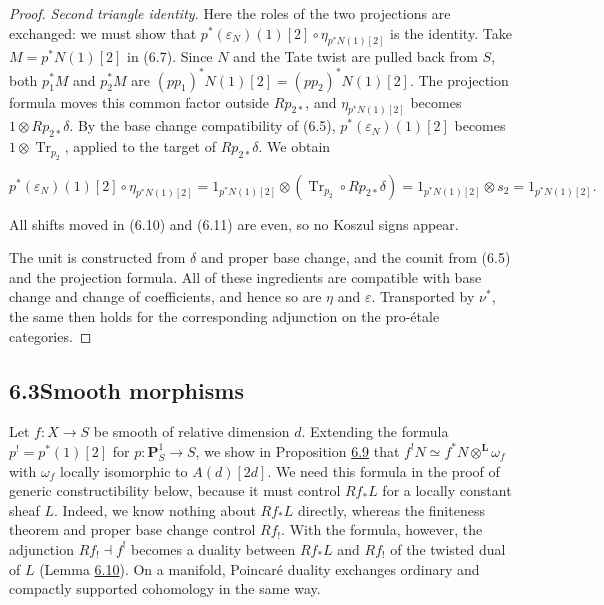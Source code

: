 \documentclass[11pt]{article}
\begin{document}
\begin{proof}[{Proof}]
\emph{Second triangle identity.} Here the roles of the two projections are exchanged: we must show that \(p^*(\varepsilon_N)(1)[2]\circ\eta_{p^*N(1)[2]}\) is the identity. Take \(M=p^*N(1)[2]\) in (6.7). Since \(N\) and the Tate twist are pulled back from \(S\), both \(p_1^*M\) and \(p_2^*M\) are \((pp_1)^*N(1)[2]=(pp_2)^*N(1)[2]\). The projection formula moves this common factor outside \(Rp_{2*}\), and \(\eta_{p^*N(1)[2]}\) becomes \(1\otimes Rp_{2*}\delta\). By the base change compatibility of (6.5), \(p^*(\varepsilon_N)(1)[2]\) becomes \(1\otimes\operatorname{Tr}_{p_2}\), applied to the target of \(Rp_{2*}\delta\). We obtain

\[
p^*(\varepsilon_N)(1)[2]\circ\eta_{p^*N(1)[2]}
=1_{p^*N(1)[2]}\otimes
(\operatorname{Tr}_{p_2}\circ Rp_{2*}\delta)
=1_{p^*N(1)[2]}\otimes s_2=1_{p^*N(1)[2]}.
\tag{6.11}
\]

All shifts moved in (6.10) and (6.11) are even, so no Koszul signs appear.

The unit is constructed from \(\delta\) and proper base change, and the counit from (6.5) and the projection formula. All of these ingredients are compatible with base change and change of coefficients, and hence so are \(\eta\) and \(\varepsilon\). Transported by \(\nu^*\), the same then holds for the corresponding adjunction on the pro-étale categories.
\end{proof}


\subsection*{\texorpdfstring{6.3\quad Smooth morphisms}{6.3 Smooth morphisms}}
\label{bp24}%
\label{bp25}%
Let \(f:X\to S\) be smooth of relative dimension \(d\). Extending the formula \(p^!=p^*(1)[2]\) for \(p:\mathbf P^1_S\to S\), we show in Proposition \hyperref[bp30]{6.9} that \(f^!N\simeq f^*N\otimes^{\mathbf L}\omega_f\) with \(\omega_f\) locally isomorphic to \(A(d)[2d]\). We need this formula in the proof of generic constructibility below, because it must control \(Rf_*L\) for a locally constant sheaf \(L\). Indeed, we know nothing about \(Rf_*L\) directly, whereas the finiteness theorem and proper base change control \(Rf_!\). With the formula, however, the adjunction \(Rf_!\dashv f^!\) becomes a duality between \(Rf_*L\) and \(Rf_!\) of the twisted dual of \(L\) (Lemma \hyperref[bp33]{6.10}). On a manifold, Poincaré duality exchanges ordinary and compactly supported cohomology in the same way.
\end{document}
